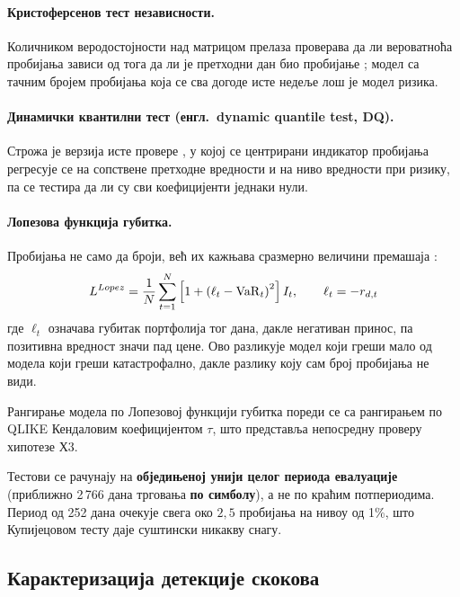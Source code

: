 \paragraph{Кристоферсенов тест независности.}
Количником веродостојности над матрицом прелаза проверава да ли вероватноћа пробијања
зависи од тога да ли је претходни дан био пробијање \parencite{christoffersen1998};
модел са тачним бројем пробијања која се сва догоде исте недеље лош је модел ризика.

\paragraph{Динамички квантилни тест (енгл.\ dynamic quantile test, DQ).}
Строжа је верзија исте провере \parencite{engleManganelli2004}, у којој се центрирани индикатор
пробијања регресује се на сопствене претходне вредности и на ниво вредности при ризику,
па се тестира да ли су сви коефицијенти једнаки нули.

\paragraph{Лопезова функција губитка.}
Пробијања не само да броји, већ их кажњава сразмерно величини премашаја
\parencite{lopez1999}:
\begin{equation}
L^{Lopez} = \frac{1}{N}\sum_{t=1}^{N}
\left[1 + \left(\ell_{t} - \mathrm{VaR}_t\right)^{2}\right]I_t,
\qquad
\ell_{t} = -r_{d,t}
\label{eq:lopez}
\end{equation}
где $\ell_t$ означава губитак портфолија тог дана, дакле негативан принос, па позитивна
вредност значи пад цене. Ово разликује модел који греши мало од модела који греши
катастрофално, дакле разлику коју сам број пробијања не види.

Рангирање модела по Лопезовој функцији губитка пореди се са рангирањем по QLIKE
Кендаловим коефицијентом $\tau$, што представља непосредну проверу хипотезе Х3.

Тестови се рачунају на \textbf{обједињеној унији целог периода евалуације}
(приближно 2\,766 дана трговања \textbf{по симболу}), а не по краћим потпериодима. Период од
252 дана очекује свега око $2{,}5$ пробијања на нивоу од 1\%, што Купијецовом тесту
даје суштински никакву снагу.

\subsection{Карактеризација детекције скокова}

